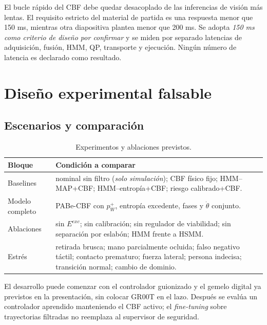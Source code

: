 \documentclass[10pt,a4paper,twocolumn]{article}
\begin{document}
El bucle rápido del CBF debe quedar desacoplado de las inferencias de visión más lentas. El requisito estricto del material de partida es una respuesta menor que 150 ms, mientras otra diapositiva plantea menor que 200 ms. Se adopta \emph{150 ms como criterio de diseño por confirmar} y se miden por separado latencias de adquisición, fusión, HMM, QP, transporte y ejecución. Ningún número de latencia es declarado como resultado.

\section{Diseño experimental falsable}
\subsection{Escenarios y comparación}
\begin{table}[H]
\centering\footnotesize
\caption{Experimentos y ablaciones previstos.}\vspace{2pt}
\begin{tabularx}{\columnwidth}{@{}p{}X@{}}
\toprule
\textbf{Bloque} & \textbf{Condición a comparar} \\
\midrule
Baselines & nominal sin filtro (\emph{solo simulación}); CBF físico fijo; HMM--MAP+CBF; HMM--entropía+CBF; riesgo calibrado+CBF.\\
Modelo completo & PABe-CBF con $p_W^+$, entropía excedente, fases y $\dot\theta$ conjunto.\\
Ablaciones & sin $E^{exc}$; sin calibración; sin regulador de viabilidad; sin separación por eslabón; HMM frente a HSMM.\\
Estrés & retirada brusca; mano parcialmente ocluida; falso negativo táctil; contacto prematuro; fuerza lateral; persona indecisa; transición normal; cambio de dominio.\\
\bottomrule
\end{tabularx}
\label{tab:ablation}
\end{table}

El desarrollo puede comenzar con el controlador guionizado y el gemelo digital ya previstos en la presentación, sin colocar GR00T en el lazo. Después se evalúa un controlador aprendido manteniendo el CBF activo; el \emph{fine-tuning} sobre trayectorias filtradas no reemplaza al supervisor de seguridad.
\end{document}
